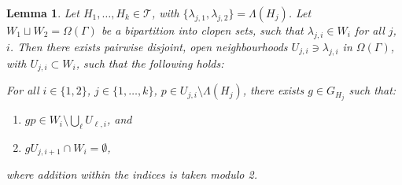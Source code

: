 \documentclass[11pt,a4paper]{amsart}
\newtheorem{lemma}[theorem]{Lemma}
\theoremstyle{definition}
\begin{document}
    \begin{lemma}\label{claim:technical-boundary-claim}
        Let $H_1, \ldots, H_k \in \mathcal T$, with $\{\lambda_{j,1}, \lambda_{j,2}\} = \Lambda(H_j)$. Let $W_1 \sqcup W_2 = \Omega(\Gamma)$ be a bipartition into clopen sets, such that $\lambda_{j,i} \in W_i$ for all $j$, $i$. Then there exists pairwise disjoint, open neighbourhoods $U_{j,i} \ni \lambda_{j,i}$ in $\Omega(\Gamma)$, with $U_{j,i} \subset W_i$, such that the following holds:
            
            For all $i \in \{1,2\}$, $j \in \{1,\ldots, k\}$, $p \in U_{j,i} \setminus \Lambda(H_j)$, there exists $g \in G_{H_j}$ such that:
            \begin{enumerate}
                \item\label{itm:dynamics-property-1} $gp \in W_i \setminus \bigcup _\ell U_{\ell, i}$, and

                \item\label{itm:dynamics-property-2} $gU_{j,i+1} \cap W_i= \emptyset$,
            \end{enumerate}
            where addition within the indices is taken modulo 2.
    \end{lemma}
\end{document}
